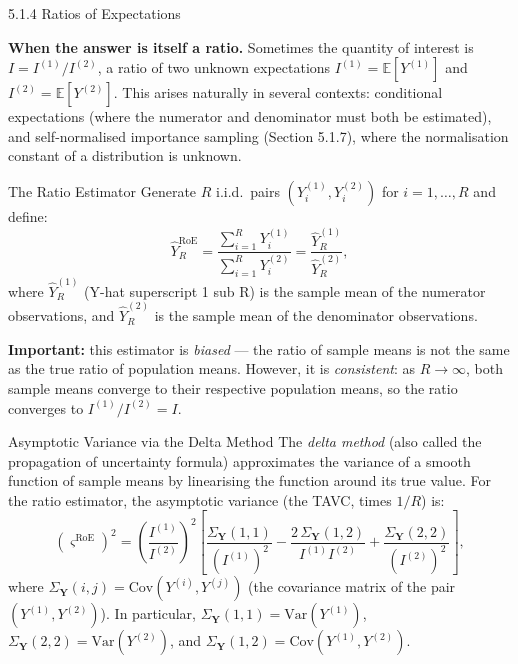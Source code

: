 \documentclass[aspectratio=169,10pt]{beamer}
\begin{document}
\begin{frame}[allowframebreaks]{5.1.4 Ratios of Expectations}

\textbf{When the answer is itself a ratio.}
Sometimes the quantity of interest is $I = I^{(1)} / I^{(2)}$, a ratio of two
unknown expectations $I^{(1)} = \mathbb{E}[Y^{(1)}]$ and
$I^{(2)} = \mathbb{E}[Y^{(2)}]$.
This arises naturally in several contexts:
conditional expectations (where the numerator and denominator must both be
estimated), and self-normalised importance sampling (Section 5.1.7), where
the normalisation constant of a distribution is unknown.

\begin{block}{The Ratio Estimator}
  Generate $R$ i.i.d.\ pairs $(Y_i^{(1)}, Y_i^{(2)})$ for $i = 1, \ldots, R$
  and define:
  \[
    \hat{Y}_R^{\mathrm{RoE}} = \frac{\displaystyle\sum_{i=1}^R Y_i^{(1)}}{\displaystyle\sum_{i=1}^R Y_i^{(2)}}
    = \frac{\hat{Y}_R^{(1)}}{\hat{Y}_R^{(2)}},
  \]
  where $\hat{Y}_R^{(1)}$ (Y-hat superscript 1 sub R) is the sample mean of
  the numerator observations, and $\hat{Y}_R^{(2)}$ is the sample mean of
  the denominator observations.

  \textbf{Important:} this estimator is \emph{biased} --- the ratio of sample
  means is not the same as the true ratio of population means.  However, it is
  \emph{consistent}: as $R \to \infty$, both sample means converge to their
  respective population means, so the ratio converges to $I^{(1)}/I^{(2)} = I$.
\end{block}

\framebreak

\begin{block}{Asymptotic Variance via the Delta Method}
  The \emph{delta method} (also called the propagation of uncertainty formula)
  approximates the variance of a smooth function of sample means by linearising
  the function around its true value.
  For the ratio estimator, the asymptotic variance (the TAVC, times $1/R$) is:
  \[
    (\varsigma^{\mathrm{RoE}})^2
    = \left(\frac{I^{(1)}}{I^{(2)}}\right)^{\!2}
      \!\left[\frac{\Sigma_{\mathbf{Y}}(1,1)}{(I^{(1)})^2}
              - \frac{2\,\Sigma_{\mathbf{Y}}(1,2)}{I^{(1)}I^{(2)}}
              + \frac{\Sigma_{\mathbf{Y}}(2,2)}{(I^{(2)})^2}\right],
  \]
  where $\Sigma_{\mathbf{Y}}(i,j) = \mathrm{Cov}(Y^{(i)}, Y^{(j)})$
  (the covariance matrix of the pair $(Y^{(1)}, Y^{(2)})$).
  In particular, $\Sigma_{\mathbf{Y}}(1,1) = \mathrm{Var}(Y^{(1)})$,
  $\Sigma_{\mathbf{Y}}(2,2) = \mathrm{Var}(Y^{(2)})$, and
  $\Sigma_{\mathbf{Y}}(1,2) = \mathrm{Cov}(Y^{(1)}, Y^{(2)})$.


\end{block}
\end{frame}
\end{document}
